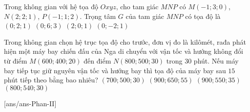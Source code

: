 \begin{ex}%
Trong không gian với hệ tọa độ $Oxyz$, cho tam giác $MNP$ có $M(-1;3;0)$, $N(2;2;1)$, $P(-1;1;2)$. Trọng tâm $G$ của tam giác $MNP$ có tọa độ là
\choice
{\True $(0;2;1)$}
{$(0;6;3)$}
{$(2;0;1)$}
{$(0;-2;1)$}
\end{ex}


\begin{ex}%
Trong không gian chọn hệ trục tọa độ cho trước, đơn vị đo là kilômét, rađa phát hiện một máy bay chiến đấu của Nga di chuyển với vận tốc và hướng không đổi từ điểm $M(600;400;20)$ đến điểm $N(800;500;30)$ trong $30$ phút. Nếu máy bay tiếp tục giữ nguyên vận tốc và hướng bay thì tọa độ của máy bay sau $15$ phút tiếp theo bằng bao nhiêu?
\choice
{$(700;500;30)$}
{$(900;650;55)$}
{\True $(900;550;35)$}
{$(800;540;30)$}
\end{ex}


\cauds
{}[ans/ans\currfilebase-Phan-II]

